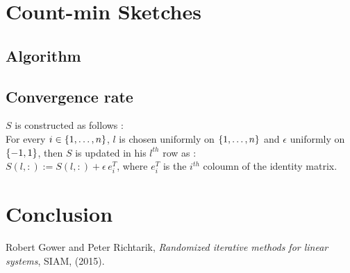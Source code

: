 \chapter{Count-min Sketches}

%
%
%

\section{Algorithm}


\section{Convergence rate}

$S$ is constructed as follows :\\
For every $i\in\left\{1,\dots,n\right\}$, $l$ is chosen uniformly on $\left\{1,\dots,n\right\}$ and $\epsilon$ uniformly on $\left\{-1,1\right\}$, then $S$ is updated in his $l^{th}$ row as :\\
$S(l, :) := S(l,:) + \epsilon \, e_{i}^{T}$, where $e_{i}^{T}$ is the $i^{th}$ coloumn of the identity matrix.

\chapter{Conclusion}

\appendix
\begin{thebibliography}{1}

\bibitem{}
{\sc Robert Gower and Peter Richtarik}, {\em Randomized iterative methods for linear systems}, SIAM, 
  (2015).



\end{thebibliography}





